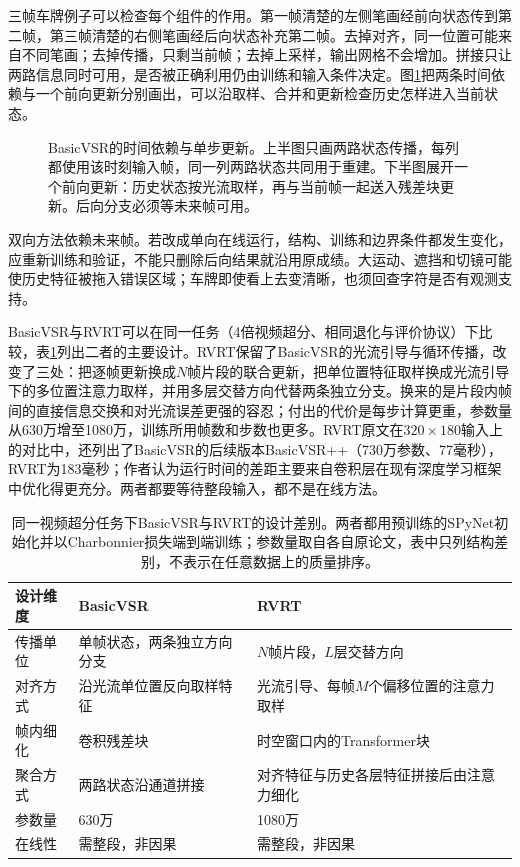 三帧车牌例子可以检查每个组件的作用。第一帧清楚的左侧笔画经前向状态传到第二帧，第三帧清楚的右侧笔画经后向状态补充第二帧。去掉对齐，同一位置可能来自不同笔画；去掉传播，只剩当前帧；去掉上采样，输出网格不会增加。拼接只让两路信息同时可用，是否被正确利用仍由训练和输入条件决定。图\ref{fig:vision-basicvsr-propagation}把两条时间依赖与一个前向更新分别画出，可以沿取样、合并和更新检查历史怎样进入当前状态。

\begin{figure}[htbp]
  \centering
  
  \caption{BasicVSR的时间依赖与单步更新。上半图只画两路状态传播，每列都使用该时刻输入帧，同一列两路状态共同用于重建。下半图展开一个前向更新：历史状态按光流取样，再与当前帧一起送入残差块更新。后向分支必须等未来帧可用。}
  \label{fig:vision-basicvsr-propagation}
\end{figure}
\FloatBarrier

双向方法依赖未来帧。若改成单向在线运行，结构、训练和边界条件都发生变化，应重新训练和验证，不能只删除后向结果就沿用原成绩。大运动、遮挡和切镜可能使历史特征被拖入错误区域；车牌即使看上去变清晰，也须回查字符是否有观测支持。

BasicVSR与RVRT可以在同一任务（4倍视频超分、相同退化与评价协议）下比较，表\ref{tab:vision-video-rvrt-basicvsr}列出二者的主要设计。RVRT保留了BasicVSR的光流引导与循环传播，改变了三处：把逐帧更新换成$N$帧片段的联合更新，把单位置特征取样换成光流引导下的多位置注意力取样，并用多层交替方向代替两条独立分支。换来的是片段内帧间的直接信息交换和对光流误差更强的容忍；付出的代价是每步计算更重，参数量从630万增至1080万，训练所用帧数和步数也更多。RVRT原文在$320\times180$输入上的对比中，还列出了BasicVSR的后续版本BasicVSR++（730万参数、77毫秒），RVRT为183毫秒；作者认为运行时间的差距主要来自卷积层在现有深度学习框架中优化得更充分。两者都要等待整段输入，都不是在线方法。

\begin{table}[htbp]
  \centering
  \begin{tabularx}{\linewidth}{@{}lXX@{}}
    \toprule
    设计维度 & BasicVSR & RVRT\\
    \midrule
    传播单位 & 单帧状态，两条独立方向分支 & $N$帧片段，$L$层交替方向\\
    对齐方式 & 沿光流单位置反向取样特征 & 光流引导、每帧$M$个偏移位置的注意力取样\\
    帧内细化 & 卷积残差块 & 时空窗口内的Transformer块\\
    聚合方式 & 两路状态沿通道拼接 & 对齐特征与历史各层特征拼接后由注意力细化\\
    参数量 & 630万 & 1080万\\
    在线性 & 需整段，非因果 & 需整段，非因果\\
    \bottomrule
  \end{tabularx}
  \caption{同一视频超分任务下BasicVSR与RVRT的设计差别。两者都用预训练的SPyNet初始化并以Charbonnier损失端到端训练；参数量取自各自原论文，表中只列结构差别，不表示在任意数据上的质量排序。}
  \label{tab:vision-video-rvrt-basicvsr}
\end{table}

